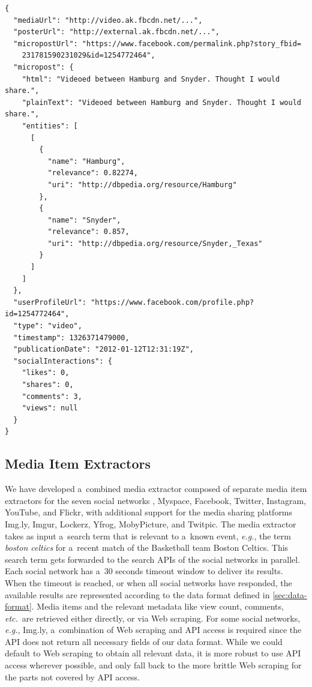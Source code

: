 \begin{lstlisting}[caption={[Sample output of the media extractor]{Sample output of the media extractor
  showing a~Facebook post processed with named entity extraction
  and disambiguation (slightly edited for legibility)}},
  label={code:facebook}]
{
  "mediaUrl": "http://video.ak.fbcdn.net/...",
  "posterUrl": "http://external.ak.fbcdn.net/...",
  "micropostUrl": "https://www.facebook.com/permalink.php?story_fbid=
    231781590231029&id=1254772464",
  "micropost": {
    "html": "Videoed between Hamburg and Snyder. Thought I would share.",
    "plainText": "Videoed between Hamburg and Snyder. Thought I would share.",
    "entities": [
      [
        {
          "name": "Hamburg",
          "relevance": 0.82274,
          "uri": "http://dbpedia.org/resource/Hamburg"
        },
        {
          "name": "Snyder",
          "relevance": 0.857,
          "uri": "http://dbpedia.org/resource/Snyder,_Texas"
        }
      ]
    ]
  },
  "userProfileUrl": "https://www.facebook.com/profile.php?id=1254772464",
  "type": "video",
  "timestamp": 1326371479000,
  "publicationDate": "2012-01-12T12:31:19Z",
  "socialInteractions": {
    "likes": 0,
    "shares": 0,
    "comments": 3,
    "views": null
  }
}
\end{lstlisting}

\subsection{Media Item Extractors}
\label{sec:media-item-extractors}

We have developed a~combined media extractor composed of
separate media item extractors for the seven social networks
\googleplus, Myspace, Facebook, Twitter, Instagram, YouTube,
and Flickr, with additional support for the media sharing
platforms Img.ly, Imgur, Lockerz, Yfrog, MobyPicture, and Twitpic.
The media extractor takes as input a~search term that is relevant
to a~known event, \emph{e.g.}, the term \emph{boston celtics}
for a~recent match of the Basketball team Boston Celtics.
This search term gets forwarded to the search APIs
of the social networks in parallel.
Each social network has a~30 seconds timeout window
to deliver its results.
When the timeout is reached,
or when all social networks have responded,
the available results are represented according to the data format
defined in \autoref{sec:data-format}.
Media items and the relevant metadata like view count, comments,
\emph{etc.}\ are retrieved either directly, or via Web scraping.
For some social networks, \emph{e.g.}, Img.ly,
a~combination of Web scraping and API access is required
since the API does not return all necessary fields
of our data format.
While we could default to Web scraping
to obtain all relevant data,
it is more robust to use API access wherever possible,
and only fall back to the more brittle Web scraping
for the parts not covered by API access.

